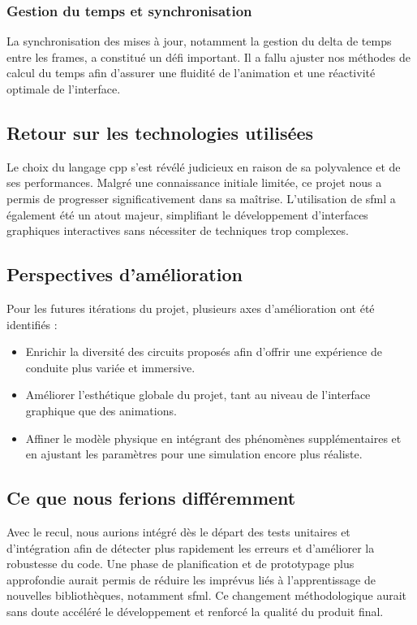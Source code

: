\subsubsection{Gestion du temps et synchronisation}\label{subsubsec:la-gestion-du-temps}
La synchronisation des mises à jour, notamment la gestion du delta de temps entre les frames, a constitué un défi important.
Il a fallu ajuster nos méthodes de calcul du temps afin d’assurer une fluidité de l’animation et une réactivité optimale de l’interface.

\subsection{Retour sur les technologies utilisées}\label{subsec:retour-sur-les-technologies-utilisees}
Le choix du langage \gls{cpp} s'est révélé judicieux en raison de sa polyvalence et de ses performances.
Malgré une connaissance initiale limitée, ce projet nous a permis de progresser significativement dans sa maîtrise.
L'utilisation de \gls{sfml} a également été un atout majeur, simplifiant le développement d'interfaces graphiques interactives sans nécessiter de techniques trop complexes.

\subsection{Perspectives d'amélioration}\label{subsec:perspectives-d'ameliorations}
Pour les futures itérations du projet, plusieurs axes d'amélioration ont été identifiés :
\begin{itemize}
    \item Enrichir la diversité des circuits proposés afin d'offrir une expérience de conduite plus variée et immersive.
    \item Améliorer l'esthétique globale du projet, tant au niveau de l'interface graphique que des animations.
    \item Affiner le modèle physique en intégrant des phénomènes supplémentaires et en ajustant les paramètres pour une simulation encore plus réaliste.
\end{itemize}

\subsection{Ce que nous ferions différemment}\label{subsec:ce-que-nous-ferions-differemment}
Avec le recul, nous aurions intégré dès le départ des tests unitaires et d'intégration afin de détecter plus rapidement les erreurs et d'améliorer la robustesse du code.
Une phase de planification et de prototypage plus approfondie aurait permis de réduire les imprévus liés à l'apprentissage de nouvelles bibliothèques, notamment \gls{sfml}\@.
Ce changement méthodologique aurait sans doute accéléré le développement et renforcé la qualité du produit final.

